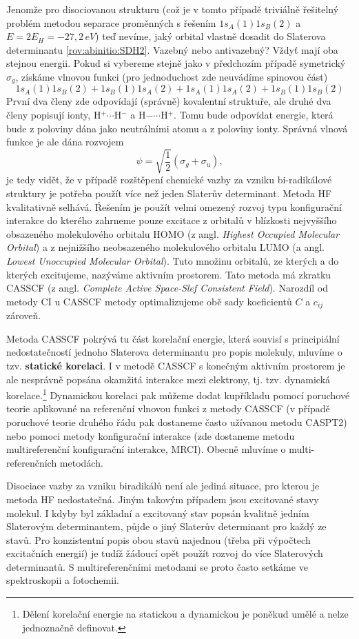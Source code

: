 Jenomže pro disociovanou strukturu (což je v tomto  případě triviálně řešitelný problém metodou separace proměnných s řešením $1s_A(1)1s_B(2)$ a $E=2E_H=-27,2\,eV$) teď nevíme, jaký orbital vlastně dosadit do Slaterova determinantu \ref{rov:abinitio:SDH2}. Vazebný nebo antivazebný? Vždyť mají oba stejnou energii. Pokud si vybereme stejně jako v předchozím případě symetrický $\sigma_g$, získáme vlnovou funkci (pro jednoduchost zde neuvádíme spinovou část)
\begin{equation}
1s_A(1)1s_B(2)+1s_B(1)1s_A(2)+1s_A(1)1s_A(2)+ 1s_B(1)1s_B(2)
\end{equation}
První dva členy zde odpovídají (správně) kovalentní struktuře, ale druhé dva členy popisují ionty, H$^+\cdots$H$^-$ a H$-\cdots$H$^+$. Tomu bude odpovídat energie, která bude z poloviny dána jako neutrálními atomu a z poloviny ionty. Správná vlnová funkce je ale dána rozvojem
\begin{equation}
\psi= \sqrt{\frac{1}{2}} (\sigma_g+\sigma_u), 
\end{equation}
je tedy vidět, že v případě rozštěpení chemické vazby za vzniku bi-radikálové struktury je potřeba použít více než jeden Slaterův determinant. Metoda HF kvalitativně selhává. Ŕešením je použít velmi omezený rozvoj typu konfigurační interakce do kterého zahrneme pouze excitace z orbitalů v blízkosti nejvyššího obsazeného molekulového orbitalu HOMO (z angl. \textit{Highest Occupied Molecular Orbital}) a z nejnižšího neobsazeného molekulového orbitalu LUMO (a angl. \textit{Lowest Unoccupied Molecular Orbital}). Tuto množinu orbitalů, ze kterých a do kterých excitujeme, nazýváme aktivním prostorem. Tato metoda má zkratku CASSCF (z angl. \textit{Complete Active Space-Slef Consistent Field}). Narozdíl od metody CI u CASSCF metody optimalizujeme obě sady koeficientů $C$ a $c_{ij}$ zároveň. 

Metoda CASSCF pokrývá tu část korelační energie, která souvisí s principiální nedostatečností jednoho Slaterova determinantu pro popis molekuly, mluvíme o tzv. \textbf{statické korelaci}. I v metodě CASSCF s konečným aktivním prostorem je ale nesprávně popsána okamžitá interakce mezi elektrony, tj. tzv. dynamická korelace.\footnote{Dělení korelační energie na statickou a dynamickou je poněkud umělé a nelze jednoznačně definovat.} Dynamickou korelaci pak můžeme dodat kupříkladu pomocí poruchové teorie aplikované na referenční vlnovou funkci z metody CASSCF (v případě poruchové teorie druhého řádu pak dostaneme často užívanou metodu CASPT2) nebo pomoci metody konfigurační interakce (zde dostaneme metodu multireferenční konfigurační interakce, MRCI). Obecně mluvíme o multi-referenčních metodách.

Disociace vazby za vzniku biradikálů není ale jediná situace, pro kterou je metoda HF nedostatečná. Jiným takovým případem jsou excitované stavy molekul. I kdyby byl základní a excitovaný stav popsán kvalitně jedním Slaterovým determinantem, půjde o jiný Slaterův determinant pro každý ze stavů. Pro konzistentní popis obou stavů najednou (třeba při výpočtech excitačních energií) je tudíž žádoucí opět použít rozvoj do více Slaterových determinantů. S multireferenčními metodami se proto často setkáme ve spektroskopii a fotochemii. 
